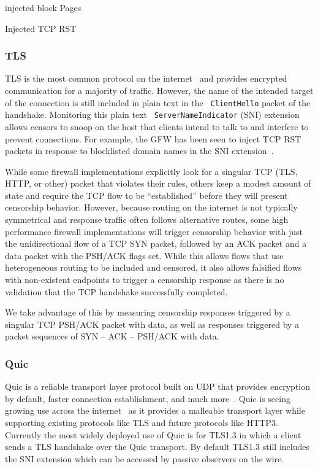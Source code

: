 injected block Pages

Injected TCP RST


\subsubsection{TLS}

TLS is the most common protocol on the internet~\cite{} and provides encrypted
communication for a majority of traffic. However, the name of the intended
target of the connection is still included in plain text in the {\tt
ClientHello} packet of the handshake. Monitoring this plain text {\tt
ServerNameIndicator} (SNI) extension allows censors to snoop on the host that
clients intend to talk to and interfere to prevent connections. For example, the
GFW has been seen to inject TCP RST packets in response to blocklisted domain
names in the SNI extension~\cite{}.

While some firewall implementations explicitly look for a singular TCP (TLS,
HTTP, or other) packet that violates their rules, others keep a modest amount of
state and require the TCP flow to be ``established'' before they will present
censorship behavior. However, because routing on the internet is not typically
symmetrical and response traffic often follows alternative routes, some high
performance firewall implementations will trigger censorship behavior with just
the unidirectional flow of a TCP SYN packet, followed by an ACK packet and a
data packet with the PSH/ACK flags set. While this allows flows that use
heterogeneous routing to be included and censored, it also allows falsified
flows with non-existent endpoints to trigger a censorship response as there is
no validation that the TCP handshake successfully completed.

We take advantage of this by measuring censorship responses triggered by a
singular TCP PSH/ACK packet with data, as well as responses triggered by a
packet sequences of SYN -- ACK -- PSH/ACK with data.

\subsubsection{Quic}

Quic is a reliable transport layer protocol built on UDP that provides
encryption by default, faster connection establishment, and much
more~\cite{RFC9000}. Quic is seeing growing use across the internet~\cite{} as it
provides a malleable transport layer while supporting existing protocols like
TLS and future protocols like HTTP3. Currently the most widely deployed use of
Quic is for TLS1.3 in which a client sends a TLS handshake over the Quic
transport. By default TLS1.3 still includes the SNI extension which can be
accessed by passive observers on the wire.

